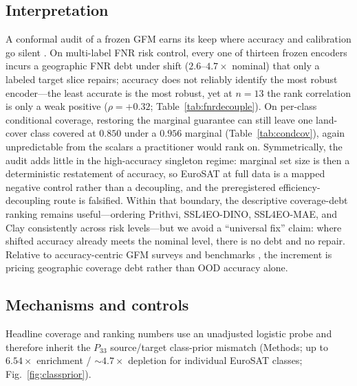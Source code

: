 \documentclass[journal]{IEEEtran}
\renewcommand{\_}{\textunderscore\allowbreak}
\begin{document}
\subsection{Interpretation}
A conformal audit of a frozen GFM earns its keep where accuracy and calibration go silent
\citep{guo2017calibration,ovadia2019uncertainty}. On multi-label FNR risk control, every one of
thirteen frozen encoders incurs a geographic FNR debt under shift ($2.6$--$4.7\times$ nominal) that
only a labeled target slice repairs; accuracy does not reliably identify the most robust
encoder---the least accurate is the most robust, yet at $n{=}13$ the rank correlation is only a weak
positive ($\rho{=}+0.32$; Table~\ref{tab:fnrdecouple}). On per-class conditional coverage, restoring the
marginal guarantee can still leave one land-cover class covered at $0.850$ under a $0.956$ marginal
(Table~\ref{tab:condcov}), again unpredictable from the scalars a practitioner would rank on.
Symmetrically, the audit adds little in the high-accuracy singleton regime: marginal set size is then a
deterministic restatement of accuracy, so EuroSAT at full data is a mapped negative control rather than
a decoupling, and the preregistered efficiency-decoupling route is falsified. Within that boundary, the
descriptive coverage-debt ranking remains useful---ordering Prithvi, SSL4EO-DINO, SSL4EO-MAE, and Clay
consistently across risk levels---but we avoid a ``universal fix'' claim: where shifted accuracy already
meets the nominal level, there is no debt and no repair. Relative to accuracy-centric GFM surveys and
benchmarks \citep{xiao2025rsfm,lacoste2023geobench,ghamisi2025sustainfm}, the increment is pricing
geographic coverage debt rather than OOD accuracy alone.

\subsection{Mechanisms and controls}
Headline coverage and ranking numbers use an unadjusted logistic probe and therefore inherit the
$P_{33}$ source/target class-prior mismatch (Methods; up to $6.54\times$ enrichment / $\sim\!4.7\times$
depletion for individual EuroSAT classes; Fig.~\ref{fig:classprior}).
\end{document}
